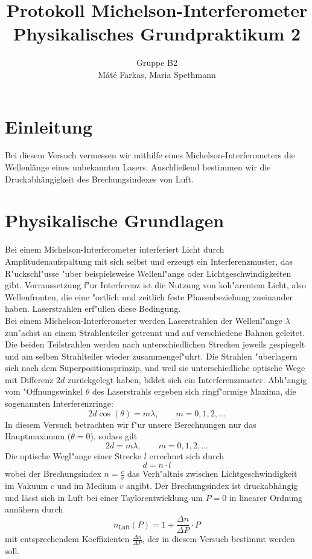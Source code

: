 \documentclass[12pt,a4paper]{article}
\author{Gruppe B2 \\ Máté Farkas, Maria Spethmann}
\title{Protokoll Michelson-Interferometer \\ Physikalisches Grundpraktikum 2}
\begin{document}
	\maketitle
	\thispagestyle{empty} %
	\newpage
	\pagestyle{headings} %
	\tableofcontents
	\newpage


\section{Einleitung}
Bei diesem Versuch vermessen wir mithilfe eines Michelson-Interferometers die Wellenlänge eines unbekannten Lasers. Anschließend bestimmen wir die Druckabhängigkeit des Brechungsindexes von Luft.
\section{Physikalische Grundlagen} 
Bei einem Michelson-Interferometer interferiert Licht durch Amplitudenaufspaltung mit sich selbst und erzeugt ein Interferenzmuster, das R"uckschl"usse "uber beispielsweise Wellenl"ange oder Lichtgeschwindigkeiten gibt. Vorraussetzung f"ur Interferenz ist die Nutzung von koh"arentem Licht, also Wellenfronten, die eine "ortlich und zeitlich feste Phasenbeziehung zueinander haben. Laserstrahlen erf"ullen diese Bedingung.\\
Bei einem Michelson-Interferometer werden Laserstrahlen der Wellenl"ange $\lambda$ zun"achst an einem Strahlenteiler getrennt und auf verschiedene Bahnen geleitet. Die beiden Teilstrahlen werden nach unterschiedlichen Strecken jeweils gespiegelt und am selben Strahlteiler wieder zusammengef"uhrt. Die Strahlen "uberlagern sich nach dem Superpositionsprinzip, und weil sie unterschiedliche optische Wege mit Differenz $2d$ zurückgelegt haben, bildet sich ein Interferenzmuster. Abh"angig vom  "Offnungswinkel $\theta$ des Laserstrahls ergeben sich ringf"ormige Maxima, die sogenannten Interferenzringe:
\begin{equation}\label{eq:Interferenzmuster}
2d\cos(\theta)=m\lambda,\qquad m=0,1,2,...
\end{equation}
In diesem Versuch betrachten wir f"ur unsere Berechnungen nur das Hauptmaximum ($\theta=0$), sodass gilt
\begin{equation}\label{eq:Grundgleichung}
2d=m\lambda,\qquad m=0,1,2,...
\end{equation}
Die optische Wegl"ange einer Strecke $l$ errechnet sich durch 
\begin{equation}\label{eq:d=nl}
d=n\cdot l
\end{equation}
wobei der Brechungsindex $n=\frac{c}{v}$ das Verh"altnis zwischen Lichtgeschwindigkeit im Vakuum $c$ und im Medium $v$ angibt.
Der Brechungsindex ist druckabhängig und lässt sich in Luft bei einer Taylorentwicklung um $P=0$ in linearer Ordnung annähern durch 
\begin{equation}
n_{\text{Luft}}(P)=1+\frac{\Delta n}{\Delta P}\cdot P
\end{equation}
mit entsprechendem Koeffizienten  $\frac{\Delta n}{\Delta P}$, der in diesem Versuch bestimmt werden soll.
\end{document}
